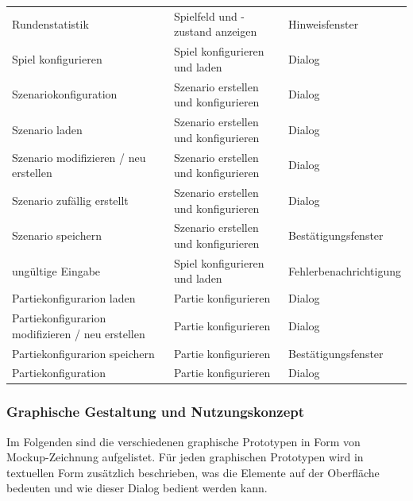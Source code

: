 \documentclass[12pt]{article}
\begin{document}
\begin{tabularx}{\linewidth}{p{4cm}|p{7cm}|l}
	Rundenstatistik & Spielfeld und -zustand anzeigen & Hinweisfenster \\ 
	Spiel konfigurieren & Spiel konfigurieren und laden & Dialog \\ 
	Szenariokonfiguration & Szenario erstellen und konfigurieren & Dialog \\ 
	Szenario laden & Szenario erstellen und konfigurieren & Dialog \\
	Szenario modifizieren / neu erstellen & Szenario erstellen und konfigurieren & Dialog \\
	Szenario zufällig erstellt & Szenario erstellen und konfigurieren & Dialog \\
	Szenario speichern & Szenario erstellen und konfigurieren & Bestätigungsfenster \\
	ungültige Eingabe & Spiel konfigurieren und laden & Fehlerbenachrichtigung \\
	Partiekonfigurarion laden & Partie konfigurieren & Dialog \\
	Partiekonfigurarion modifizieren / neu erstellen & Partie konfigurieren & Dialog \\
	Partiekonfigurarion speichern & Partie konfigurieren & Bestätigungsfenster \\
	Partiekonfiguration & Partie konfigurieren & Dialog 
\end{tabularx}

\subsubsection{Graphische Gestaltung und Nutzungskonzept}
Im Folgenden sind die verschiedenen graphische Prototypen in Form von \glqq{}Mockup\grqq{}-Zeichnung aufgelistet. Für jeden graphischen Prototypen wird in textuellen Form zusätzlich beschrieben, was die Elemente auf der Oberfläche bedeuten und wie dieser Dialog bedient werden kann. 
\end{document}
